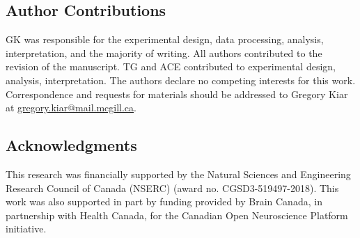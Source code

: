 \documentclass[fleqn,10pt]{SelfArx} %
\begin{document}
\subsection*{Author Contributions}
GK was responsible for the experimental design, data processing, analysis, interpretation, and the majority of writing.
All authors contributed to the revision of the manuscript. TG and ACE contributed to experimental design, analysis,
interpretation. The authors declare no competing interests for this work. Correspondence and requests for materials
should be addressed to Gregory Kiar at \url{gregory.kiar@mail.mcgill.ca}.

\subsection*{Acknowledgments} 
This research was financially supported by the Natural Sciences and Engineering Research Council of Canada (NSERC)
(award no. CGSD3-519497-2018). This work was also supported in part by funding provided by Brain Canada, in partnership
with Health Canada, for the Canadian Open Neuroscience Platform initiative.



\end{document}
